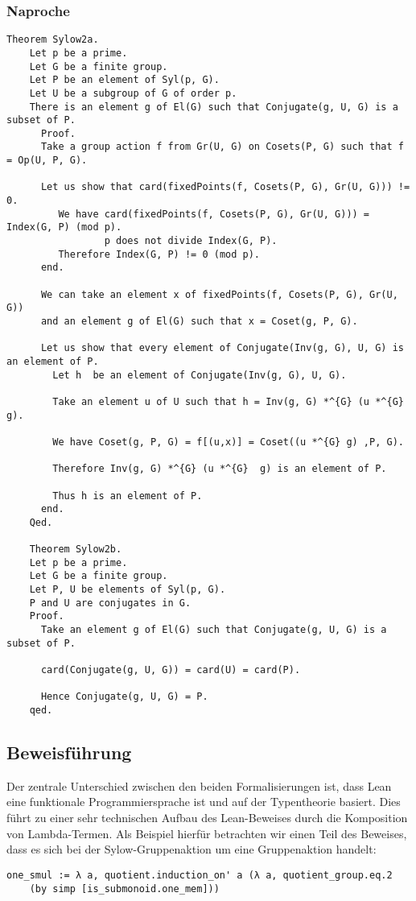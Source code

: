 \documentclass[a4paper,12pt]{scrartcl}
\begin{document}
\subsubsection{Naproche}


\begin{lstlisting}
Theorem Sylow2a.
	Let p be a prime.
	Let G be a finite group.
	Let P be an element of Syl(p, G).
	Let U be a subgroup of G of order p.
	There is an element g of El(G) such that Conjugate(g, U, G) is a subset of P.
	  Proof.
	  Take a group action f from Gr(U, G) on Cosets(P, G) such that f = Op(U, P, G).
	  
	  Let us show that card(fixedPoints(f, Cosets(P, G), Gr(U, G))) !=  0.
		 We have card(fixedPoints(f, Cosets(P, G), Gr(U, G))) = Index(G, P) (mod p).
				 p does not divide Index(G, P).
		 Therefore Index(G, P) != 0 (mod p).
	  end.
	  
	  We can take an element x of fixedPoints(f, Cosets(P, G), Gr(U, G))
	  and an element g of El(G) such that x = Coset(g, P, G).
	  
	  Let us show that every element of Conjugate(Inv(g, G), U, G) is an element of P.
		Let h  be an element of Conjugate(Inv(g, G), U, G).
	
		Take an element u of U such that h = Inv(g, G) *^{G} (u *^{G}  g).
	
		We have Coset(g, P, G) = f[(u,x)] = Coset((u *^{G} g) ,P, G).
	
		Therefore Inv(g, G) *^{G} (u *^{G}  g) is an element of P.
	
		Thus h is an element of P.
	  end.
	Qed.

	Theorem Sylow2b.
	Let p be a prime.
	Let G be a finite group.
	Let P, U be elements of Syl(p, G).
	P and U are conjugates in G.
	Proof.
	  Take an element g of El(G) such that Conjugate(g, U, G) is a subset of P.
	
	  card(Conjugate(g, U, G)) = card(U) = card(P).
	
	  Hence Conjugate(g, U, G) = P.
	qed.
\end{lstlisting}


\subsection{Beweisführung}

Der zentrale Unterschied zwischen den beiden Formalisierungen ist, dass Lean eine funktionale Programmiersprache ist und auf der Typentheorie basiert. Dies führt zu einer sehr technischen Aufbau des Lean-Beweises durch die Komposition von Lambda-Termen.
Als Beispiel hierfür betrachten wir einen Teil des Beweises, dass es sich bei der Sylow-Gruppenaktion um eine Gruppenaktion handelt:
\lstset{language=lean}
\begin{lstlisting}
one_smul := λ a, quotient.induction_on' a (λ a, quotient_group.eq.2
    (by simp [is_submonoid.one_mem]))
\end{lstlisting}
\end{document}
